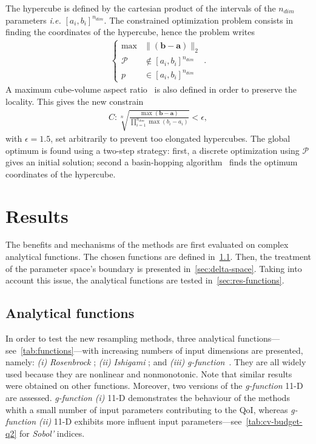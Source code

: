 The hypercube is defined by the cartesian product of the intervals of the ${n_{dim}}$ parameters \textit{i.e.} $[a_i, b_i]^{n_{dim}}$. The constrained optimization problem consists in finding the coordinates of the hypercube, hence the problem writes
\begin{align}
\left\{\begin{array}{rc} \max  &\parallel (\mathbf{b} - \mathbf{a}) \parallel_{2} \\\mathcal{P} &\notin [a_i, b_i]^{n_{dim}} \\ p &\in [a_i, b_i]^{n_{dim}} \end{array}\right. .
\end{align}
A maximum cube-volume aspect ratio~\cite{smith1998} is also defined in order to preserve the locality. This gives the new constrain
\begin{align}
C : \sqrt[n]{\frac{\max (\mathbf{b} - \mathbf{a})}{\displaystyle\prod_{i = 1}^{n_{dim}} \max (b_i - a_i)}} < \epsilon ,
\end{align}
with $\epsilon = 1.5$, set arbitrarily to prevent too elongated hypercubes. The global optimum is found using a two-step strategy: first, a discrete optimization using $\mathcal{P}$ gives an initial solution; second a basin-hopping algorithm~\cite{wales1997} finds the optimum coordinates of the hypercube.


\section{Results}
\label{sec:results}

The benefits and mechanisms of the methods are first evaluated on complex analytical functions. The chosen functions are defined in~\cref{sec:functions}. Then, the treatment of the parameter space's boundary is presented in~\cref{sec:delta-space}. Taking into account this issue, the analytical functions are tested in~\cref{sec:res-functions}.

\subsection{Analytical functions}
\label{sec:functions}

In order to test the new resampling methods, three analytical functions---see~\cref{tab:functions}---with increasing numbers of input dimensions are presented, namely: \textit{(i)} \textit{Rosenbrock} ; \textit{(ii)} \textit{Ishigami} ; and \textit{(iii)} \textit{g-function}~\cite{molga2005,ishigami1990,Saltelli2007,Legratiet2016}. They are all widely used because they are nonlinear and nonmonotonic. Note that similar results were obtained on other functions. Moreover, two versions of the \emph{g-function} 11-D are assessed. \textit{g-function (i)} 11-D demonstrates the behaviour of the methods whith a small number of input parameters contributing to the QoI, whereas \textit{g-function (ii)} 11-D exhibits more influent input parameters---see~\cref{tab:cv-budget-q2} for \emph{Sobol'} indices.

